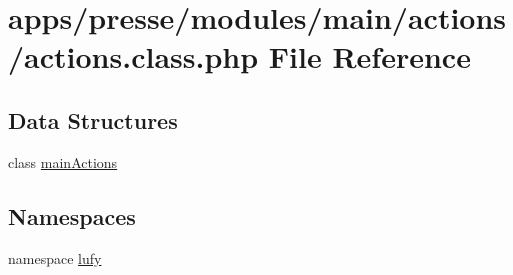 \hypertarget{presse_2modules_2main_2actions_2actions_8class_8php}{\section{apps/presse/modules/main/actions/actions.class.\-php File Reference}
\label{presse_2modules_2main_2actions_2actions_8class_8php}
}
\subsection*{Data Structures}
\begin{DoxyCompactItemize}
\item 
class \hyperlink{classmain_actions}{main\-Actions}
\end{DoxyCompactItemize}
\subsection*{Namespaces}
\begin{DoxyCompactItemize}
\item 
namespace \hyperlink{namespacelufy}{lufy}
\end{DoxyCompactItemize}
